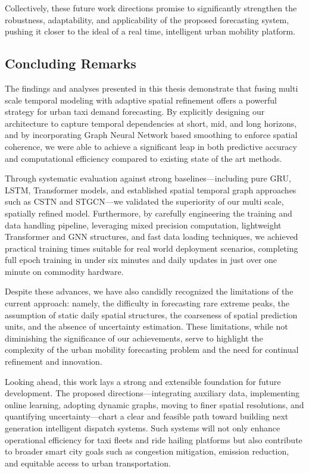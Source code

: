\documentclass{article}
\begin{document}
Collectively, these future work directions promise to significantly strengthen the robustness, adaptability, and applicability of the proposed forecasting system, pushing it closer to the ideal of a real time, intelligent urban mobility platform.

\subsection{Concluding Remarks}

The findings and analyses presented in this thesis demonstrate that fusing multi scale temporal modeling with adaptive spatial refinement offers a powerful strategy for urban taxi demand forecasting. By explicitly designing our architecture to capture temporal dependencies at short, mid, and long horizons, and by incorporating Graph Neural Network based smoothing to enforce spatial coherence, we were able to achieve a significant leap in both predictive accuracy and computational efficiency compared to existing state of the art methods.

Through systematic evaluation against strong baselines—including pure GRU, LSTM, Transformer models, and established spatial temporal graph approaches such as CSTN and STGCN—we validated the superiority of our multi scale, spatially refined model. Furthermore, by carefully engineering the training and data handling pipeline, leveraging mixed precision computation, lightweight Transformer and GNN structures, and fast data loading techniques, we achieved practical training times suitable for real world deployment scenarios, completing full epoch training in under six minutes and daily updates in just over one minute on commodity hardware.

Despite these advances, we have also candidly recognized the limitations of the current approach: namely, the difficulty in forecasting rare extreme peaks, the assumption of static daily spatial structures, the coarseness of spatial prediction units, and the absence of uncertainty estimation. These limitations, while not diminishing the significance of our achievements, serve to highlight the complexity of the urban mobility forecasting problem and the need for continual refinement and innovation.

Looking ahead, this work lays a strong and extensible foundation for future development. The proposed directions—integrating auxiliary data, implementing online learning, adopting dynamic graphs, moving to finer spatial resolutions, and quantifying uncertainty—chart a clear and feasible path toward building next generation intelligent dispatch systems. Such systems will not only enhance operational efficiency for taxi fleets and ride hailing platforms but also contribute to broader smart city goals such as congestion mitigation, emission reduction, and equitable access to urban transportation.
\end{document}
